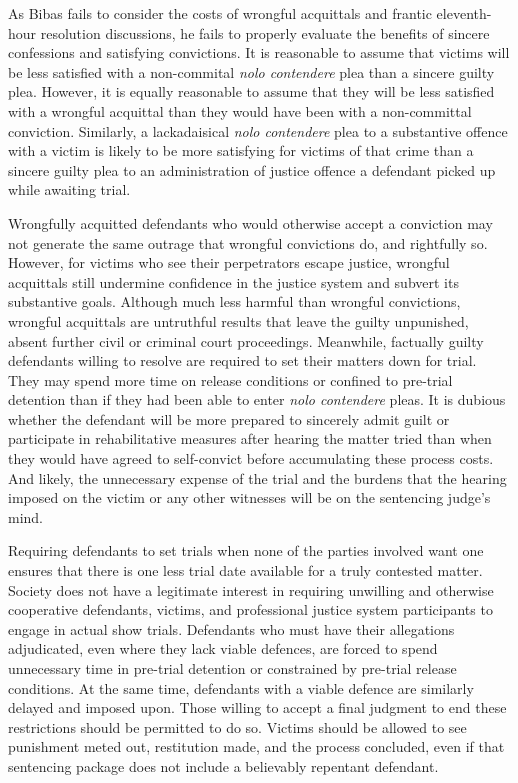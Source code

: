 As Bibas fails to consider the costs of wrongful acquittals and frantic eleventh-hour resolution discussions, he fails to properly evaluate the benefits of sincere confessions and satisfying convictions. It is reasonable to assume that victims will be less satisfied with a non-commital \textit{nolo contendere} plea than a sincere guilty plea. However, it is equally reasonable to assume that they will be less satisfied with a wrongful acquittal than they would have been with a non-committal conviction. Similarly, a lackadaisical \textit{nolo contendere} plea to a substantive offence with a victim is likely to be more satisfying for victims of that crime than a sincere guilty plea to an administration of justice offence a defendant picked up while awaiting trial. 

Wrongfully acquitted defendants who would otherwise accept a conviction may not generate the same outrage that wrongful convictions do, and rightfully so. However, for victims who see their perpetrators escape justice, wrongful acquittals still undermine confidence in the justice system and subvert its substantive goals. Although much less harmful than wrongful convictions, wrongful acquittals are untruthful results that leave the guilty unpunished, absent further civil or criminal court proceedings. Meanwhile, factually guilty defendants willing to resolve are required to set their matters down for trial. They may spend more time on release conditions or confined to pre-trial detention than if they had been able to enter \textit{nolo contendere} pleas. It is dubious whether the defendant will be more prepared to sincerely admit guilt or participate in rehabilitative measures after hearing the matter tried than when they would have agreed to self-convict before accumulating these process costs. And likely, the unnecessary expense of the trial and the burdens that the hearing imposed on the victim or any other witnesses will be on the sentencing judge's mind.

Requiring defendants to set trials when none of the parties involved want one ensures that there is one less trial date available for a truly contested matter. Society does not have a legitimate interest in requiring unwilling and otherwise cooperative defendants, victims, and professional justice system participants to engage in actual show trials. Defendants who must have their allegations adjudicated, even where they lack viable defences, are forced to spend unnecessary time in pre-trial detention or constrained by pre-trial release conditions. At the same time, defendants with a viable defence are similarly delayed and imposed upon. Those willing to accept a final judgment to end these restrictions should be permitted to do so. Victims should be allowed to see punishment meted out, restitution made, and the process concluded, even if that sentencing package does not include a believably repentant defendant. 